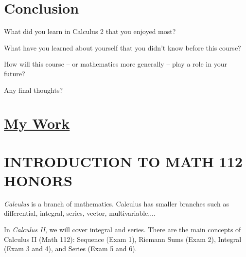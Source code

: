 \documentclass[12pt]{article}
\begin{document}
\section{Conclusion}

\noindent What did you learn in Calculus 2 that you enjoyed most?

\noindent What have you learned about yourself that you didn't know before this course?

\noindent How will this course -- or mathematics more generally -- play a role in your future?

\noindent Any final thoughts?



\newpage

\begin{center}
\section*{\underline{\Large{My Work}}}
\section*{INTRODUCTION TO MATH 112 HONORS}
\end{center}


\noindent \textit{Calculus} is a branch of mathematics. Calculus has smaller branches such as differential, integral, series, vector, multivariable,... 

\noindent In \textit{Calculus II}, we will cover integral and series. There are the main concepts of Calculus II (Math 112): Sequence (Exam 1), Riemann Sums (Exam 2), Integral (Exam 3 and 4), and Series (Exam 5 and 6).
\end{document}
